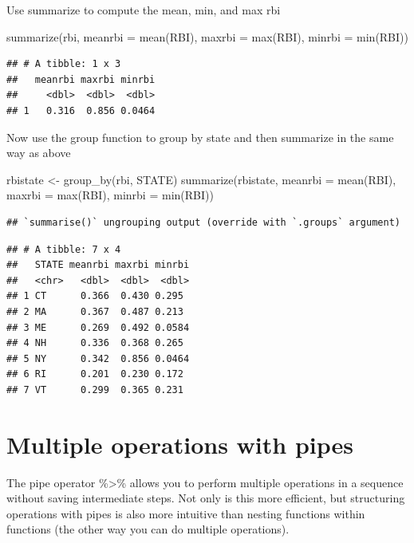 \documentclass[
]{book}
\newenvironment{Shaded}{\begin{snugshade}}{\end{snugshade}}
\newcommand{\AttributeTok}[1]{\textcolor[rgb]{0.77,0.63,0.00}{#1}}
\newcommand{\FunctionTok}[1]{\textcolor[rgb]{0.00,0.00,0.00}{#1}}
\newcommand{\NormalTok}[1]{#1}
\newcommand{\OtherTok}[1]{\textcolor[rgb]{0.56,0.35,0.01}{#1}}
\begin{document}
Use summarize to compute the mean, min, and max rbi

\begin{Shaded}
\begin{Highlighting}[]
\FunctionTok{summarize}\NormalTok{(rbi, }\AttributeTok{meanrbi =} \FunctionTok{mean}\NormalTok{(RBI), }\AttributeTok{maxrbi =} \FunctionTok{max}\NormalTok{(RBI), }\AttributeTok{minrbi =} \FunctionTok{min}\NormalTok{(RBI))}
\end{Highlighting}
\end{Shaded}

\begin{verbatim}
## # A tibble: 1 x 3
##   meanrbi maxrbi minrbi
##     <dbl>  <dbl>  <dbl>
## 1   0.316  0.856 0.0464
\end{verbatim}

Now use the group function to group by state and then summarize in the same way as above

\begin{Shaded}
\begin{Highlighting}[]
\NormalTok{rbistate }\OtherTok{\textless{}{-}} \FunctionTok{group\_by}\NormalTok{(rbi, STATE)}
\FunctionTok{summarize}\NormalTok{(rbistate, }\AttributeTok{meanrbi =} \FunctionTok{mean}\NormalTok{(RBI), }\AttributeTok{maxrbi =} \FunctionTok{max}\NormalTok{(RBI), }\AttributeTok{minrbi =} \FunctionTok{min}\NormalTok{(RBI))}
\end{Highlighting}
\end{Shaded}

\begin{verbatim}
## `summarise()` ungrouping output (override with `.groups` argument)
\end{verbatim}

\begin{verbatim}
## # A tibble: 7 x 4
##   STATE meanrbi maxrbi minrbi
##   <chr>   <dbl>  <dbl>  <dbl>
## 1 CT      0.366  0.430 0.295 
## 2 MA      0.367  0.487 0.213 
## 3 ME      0.269  0.492 0.0584
## 4 NH      0.336  0.368 0.265 
## 5 NY      0.342  0.856 0.0464
## 6 RI      0.201  0.230 0.172 
## 7 VT      0.299  0.365 0.231
\end{verbatim}

\hypertarget{multiple-operations-with-pipes}{%
\section{Multiple operations with pipes}\label{multiple-operations-with-pipes}}

The pipe operator \%\textgreater\% allows you to perform multiple operations in a sequence without saving intermediate steps. Not only is this more efficient, but structuring operations with pipes is also more intuitive than nesting functions within functions (the other way you can do multiple operations).
\end{document}
